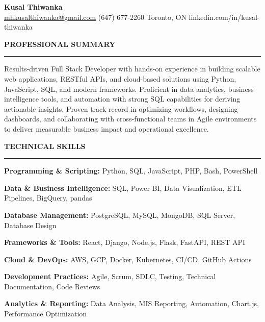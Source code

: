 \documentclass[10pt,letterpaper]{article}
\begin{document}
\begin{center}
{\LARGE\textbf{Kusal Thiwanka}}\\[3pt]
\href{mailto:mhkusalthiwanka@gmail.com}{mhkusalthiwanka@gmail.com}\hspace{2em}%
(647) 677{-}2260\hspace{2em}%
Toronto, ON\hspace{2em}
linkedin.com/in/kusal-thiwanka
\end{center}

\vspace{6pt}

\textbf{PROFESSIONAL SUMMARY}\\[-8pt]
\noindent\rule{\textwidth}{1pt}

\vspace{-2pt}

Results-driven Full Stack Developer with hands-on experience in building scalable web applications, RESTful APIs, and cloud-based solutions using Python, JavaScript, SQL, and modern frameworks. Proficient in data analytics, business intelligence tools, and automation with strong SQL capabilities for deriving actionable insights. Proven track record in optimizing workflows, designing dashboards, and collaborating with cross-functional teams in Agile environments to deliver measurable business impact and operational excellence.

\vspace{8pt}

\textbf{TECHNICAL SKILLS}\\[-8pt]
\noindent\rule{\textwidth}{1pt}

\vspace{-2pt}

\textbf{Programming \& Scripting:} Python, SQL, JavaScript, PHP, Bash, PowerShell

\textbf{Data \& Business Intelligence:} SQL, Power BI, Data Visualization, ETL Pipelines, BigQuery, pandas

\textbf{Database Management:} PostgreSQL, MySQL, MongoDB, SQL Server, Database Design

\textbf{Frameworks \& Tools:} React, Django, Node.js, Flask, FastAPI, REST API

\textbf{Cloud \& DevOps:} AWS, GCP, Docker, Kubernetes, CI/CD, GitHub Actions

\textbf{Development Practices:} Agile, Scrum, SDLC, Testing, Technical Documentation, Code Reviews

\textbf{Analytics \& Reporting:} Data Analysis, MIS Reporting, Automation, Chart.js, Performance Optimization
\end{document}
